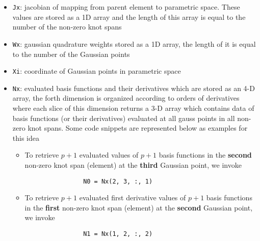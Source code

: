 \begin{itemize}
    \item \lstinline{Jx}: jacobian of mapping from parent element to parametric space. These values are stored as a 1D array and the length of this array is equal to the number of the non-zero knot spans
    \item \lstinline{Wx}: gaussian quadrature weights stored as a 1D array, the length of it is equal to the number of the Gaussian points
    \item \lstinline{Xi}: coordinate of Gaussian points in parametric space
    \item \lstinline{Nx}: evaluated basis functions and their derivatives which are stored as an 4-D array, the forth dimension is organized according to orders of derivatives where each slice of this dimension returns a 3-D array which contains data of basis functions (or their derivatives) evaluated at all gauss points in all non-zero knot spans. Some code snippets are represented below as examples for this idea
        \begin{itemize}
            \item To retrieve $p + 1$ evaluated values of $p + 1$ basis functions in the \textbf{second} non-zero knot span (element) at the \textbf{third} Gaussian point, we invoke
            \begin{lstlisting}
                N0 = Nx(2, 3, :, 1)
            \end{lstlisting}
            \item To retrieve $p + 1$ evaluated first derivative values of $p + 1$ basis functions in the \textbf{first} non-zero knot span (element) at the \textbf{second} Gaussian point, we invoke
            \begin{lstlisting}
                N1 = Nx(1, 2, :, 2)
            \end{lstlisting}
        \end{itemize}
\end{itemize}

